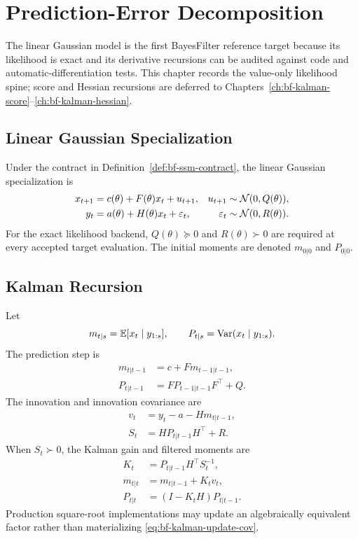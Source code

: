 \chapter{Prediction-Error Decomposition}
\label{ch:bf-prediction-error-decomposition}

The linear Gaussian model is the first BayesFilter reference target because its
likelihood is exact and its derivative recursions can be audited against code
and automatic-differentiation tests.  This chapter records the value-only
likelihood spine; score and Hessian recursions are deferred to
Chapters~\ref{ch:bf-kalman-score}--\ref{ch:bf-kalman-hessian}.

\section{Linear Gaussian Specialization}
\label{sec:bf-lgssm-specialization}

Under the contract in Definition~\ref{def:bf-ssm-contract}, the linear Gaussian
specialization is
\begin{align}
  x_{t+1} &= c(\theta) + F(\theta)x_t + u_{t+1},
  & u_{t+1} &\sim \mathcal{N}(0,Q(\theta)), \label{eq:bf-lgssm-state} \\
  y_t &= a(\theta) + H(\theta)x_t + \varepsilon_t,
  & \varepsilon_t &\sim \mathcal{N}(0,R(\theta)). \label{eq:bf-lgssm-observation}
\end{align}
For the exact likelihood backend, $Q(\theta)\succeq 0$ and
$R(\theta)\succ 0$ are required at every accepted target evaluation.  The
initial moments are denoted $m_{0|0}$ and $P_{0|0}$.

\section{Kalman Recursion}
\label{sec:bf-kalman-recursion}

Let
\[
  m_{t|s}=\mathbb{E}[x_t\mid y_{1:s}], \qquad
  P_{t|s}=\operatorname{Var}(x_t\mid y_{1:s}).
\]
The prediction step is
\begin{align}
  m_{t|t-1} &= c + Fm_{t-1|t-1}, \label{eq:bf-kalman-pred-mean}\\
  P_{t|t-1} &= FP_{t-1|t-1}F^\top + Q. \label{eq:bf-kalman-pred-cov}
\end{align}
The innovation and innovation covariance are
\begin{align}
  v_t &= y_t-a-Hm_{t|t-1}, \label{eq:bf-innovation}\\
  S_t &= HP_{t|t-1}H^\top + R. \label{eq:bf-innovation-cov}
\end{align}
When $S_t\succ 0$, the Kalman gain and filtered moments are
\begin{align}
  K_t &= P_{t|t-1}H^\top S_t^{-1}, \label{eq:bf-kalman-gain}\\
  m_{t|t} &= m_{t|t-1}+K_tv_t, \label{eq:bf-kalman-update-mean}\\
  P_{t|t} &= (I-K_tH)P_{t|t-1}. \label{eq:bf-kalman-update-cov}
\end{align}
Production square-root implementations may update an algebraically equivalent
factor rather than materializing \eqref{eq:bf-kalman-update-cov}.

